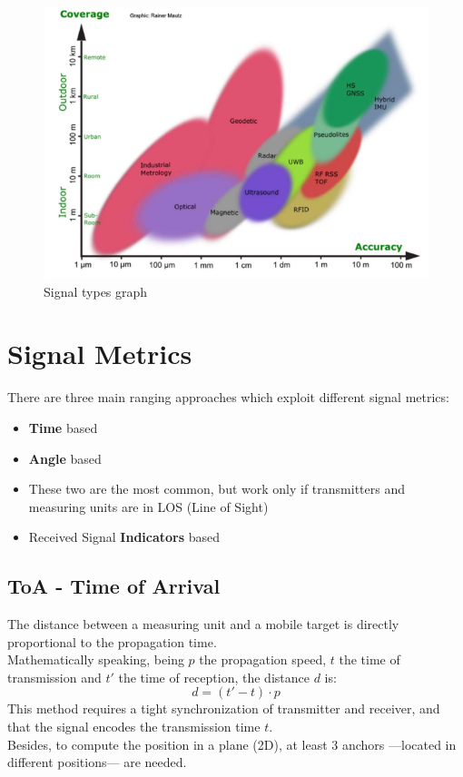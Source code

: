 \begin{figure}[htbp]
   \centering
   \includegraphics{images/signaltypes.png}
   \caption{Signal types graph}
   \label{fig:signaltypes}
\end{figure}
\section{Signal Metrics}
There are three main ranging approaches which exploit different signal metrics:
\begin{itemize}
   \item \textbf{Time} based
   \item \textbf{Angle} based
   \item[] These two are the most common, but work only if transmitters and measuring units are in LOS (Line of Sight)
   \item Received Signal \textbf{Indicators} based
\end{itemize}

\subsection{ToA - Time of Arrival}
The distance between a measuring unit and a mobile target is directly proportional to the propagation time.\\
Mathematically speaking, being $p$ the propagation speed, $t$ the time of transmission and $t'$ the time of reception, the distance $d$ is:
\[
   d = (t' - t) \cdot p
\]
This method requires a tight synchronization of transmitter and receiver, and that the signal encodes the transmission time $t$.\\
Besides, to compute the position in a plane (2D), at least 3 anchors ---located in different positions--- are needed.

